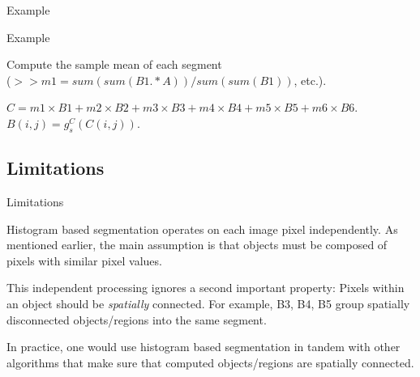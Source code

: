 %
%
\begin{slide}{Example}
\vspace{-3ex}
\end{slide}

%
%
\begin{slide}{Example}
\vspace{-3ex}
\begin{titlelist}{}{}
\small
\item<2-> Compute the sample mean of each segment \\
($>> m1=sum(sum(B1.*A))/sum(sum(B1))$, etc.).

\item<3-> $C=m1\times B1+m2\times B2+m3\times B3+m4\times B4+
m5\times B5+m6\times B6$.\\
$B(i,j)=g_s^C(C(i,j))$.


\end{titlelist}
\end{slide}


\subsection{Limitations}
%
%
\begin{slide}{Limitations}
\begin{titlelist}{}{}

\item<2-> Histogram based segmentation
operates on each image pixel independently.
As mentioned earlier, the main
assumption is that objects must be composed
of pixels with similar pixel values.

\item<3-> This independent processing ignores
a second important property: Pixels
within an object should be {\em spatially} connected.  
For example, B3, B4, B5 group spatially disconnected
objects/regions into the same segment.

\item<4-> In practice, one would use histogram based segmentation
in tandem with other algorithms
that make sure that computed objects/regions
are spatially connected.

\end{titlelist}

\end{slide}




